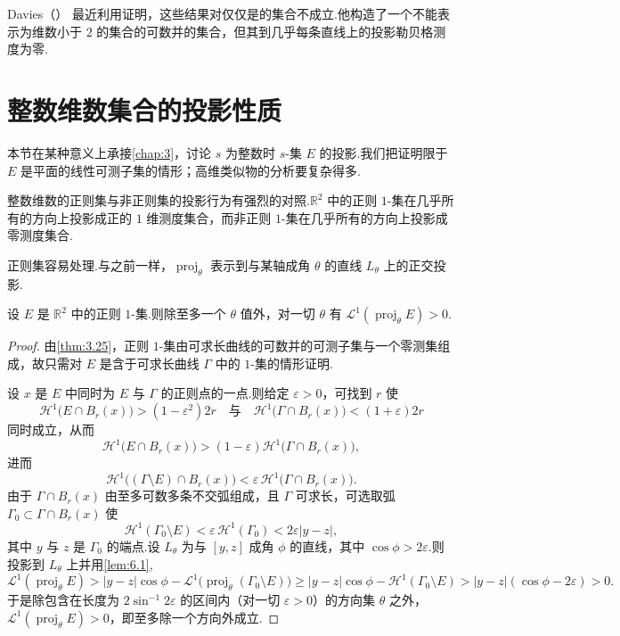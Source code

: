 Davies（\citeyear{davies1979,davies1982}） 最近利用证明，这些结果对仅仅是的集合不成立.他构造了一个不能表示为维数小于 $2$ 的集合的可数并的集合，但其到几乎每条直线上的投影勒贝格测度为零.

\section{整数维数集合的投影性质}

本节在某种意义上承接\cref{chap:3}，讨论 $s$ 为整数时 $s$-集 $E$ 的投影.我们把证明限于 $E$ 是平面的线性可测子集的情形；高维类似物的分析要复杂得多.

整数维数的正则集与非正则集的投影行为有强烈的对照.$\mathbb{R}^2$ 中的正则 $1$-集在几乎所有的方向上投影成正的 $1$ 维测度集合，而非正则 $1$-集在几乎所有的方向上投影成零测度集合.

正则集容易处理.与之前一样，$\operatorname{proj}_{\theta}$ 表示到与某轴成角 $\theta$ 的直线 $L_{\theta}$ 上的正交投影.

\begin{theorem}\label{thm:6.10}
设 $E$ 是 $\mathbb{R}^2$ 中的正则 $1$-集.则除至多一个 $\theta$ 值外，对一切 $\theta$ 有 $\mathscr{L}^1(\operatorname{proj}_{\theta}E)>0$.
\end{theorem}

\begin{proof}
由\cref{thm:3.25}，正则 $1$-集由可求长曲线的可数并的可测子集与一个零测集组成，故只需对 $E$ 是含于可求长曲线 $\Gamma$ 中的 $1$-集的情形证明.

设 $x$ 是 $E$ 中同时为 $E$ 与 $\Gamma$ 的正则点的一点.则给定 $\varepsilon>0$，可找到 $r$ 使
\[
  \mathcal{H}^{1}\bigl(E\cap B_r(x)\bigr)>(1-\varepsilon^{2})2r
  \quad\text{与}\quad
  \mathcal{H}^{1}\bigl(\Gamma\cap B_r(x)\bigr)<(1+\varepsilon)2r
\]
同时成立，从而
\[
  \mathcal{H}^{1}\bigl(E\cap B_r(x)\bigr)>(1-\varepsilon)\mathcal{H}^{1}\bigl(\Gamma\cap B_r(x)\bigr),
\]
进而
\[
  \mathcal{H}^{1}\bigl((\Gamma\setminus E)\cap B_r(x)\bigr)<\varepsilon\,\mathcal{H}^{1}\bigl(\Gamma\cap B_r(x)\bigr).
\]
由于 $\Gamma\cap B_r(x)$ 由至多可数多条不交弧组成，且 $\Gamma$ 可求长，可选取弧 $\Gamma_0\subset\Gamma\cap B_r(x)$ 使
\[
  \mathcal{H}^{1}(\Gamma_0\setminus E)<\varepsilon\,\mathcal{H}^{1}(\Gamma_0)<2\varepsilon|y-z|,
\]
其中 $y$ 与 $z$ 是 $\Gamma_0$ 的端点.设 $L_{\theta}$ 为与 $[y,z]$ 成角 $\phi$ 的直线，其中 $\cos\phi>2\varepsilon$.则投影到 $L_\theta$ 上并用\cref{lem:6.1},
\[
  \mathscr{L}^{1}(\operatorname{proj}_{\theta}E)
  >|y-z|\cos\phi-\mathscr{L}^{1}\bigl(\operatorname{proj}_{\theta}(\Gamma_0\setminus E)\bigr)
  \geq|y-z|\cos\phi-\mathcal{H}^{1}(\Gamma_0\setminus E)
  >|y-z|(\cos\phi-2\varepsilon)>0.
\]
于是除包含在长度为 $2\sin^{-1}2\varepsilon$ 的区间内（对一切 $\varepsilon>0$）的方向集 $\theta$ 之外，$\mathscr{L}^1(\operatorname{proj}_{\theta}E)>0$，即至多除一个方向外成立.
\end{proof}

